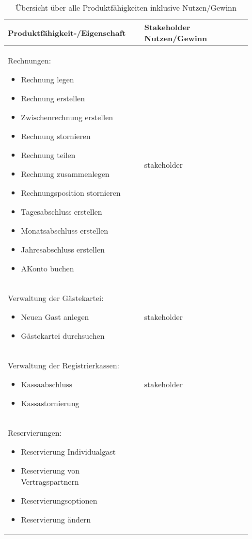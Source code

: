 \documentclass[../../Pflichtenheft.tex]{subfiles}
\begin{document}
    \begin{longtable}{|p{7cm}|p{7cm}|}
        \caption{Übersicht über alle Produktfähigkeiten inklusive Nutzen/Gewinn}
        \hline
        Produktfähigkeit-/Eigenschaft & Stakeholder Nutzen/Gewinn \\ \hline
        Rechnungen:
        \begin{itemize}
            \item Rechnung legen
            \item Rechnung erstellen
            \item Zwischenrechnung erstellen
            \item Rechnung stornieren
            \item Rechnung teilen
            \item Rechnung zusammenlegen
            \item Rechnungsposition stornieren
            \item Tagesabschluss erstellen
            \item Monatsabschluss erstellen
            \item Jahresabschluss erstellen
            \item AKonto buchen
        \end{itemize}
        & stakeholder
        \\ \hline
        Verwaltung der Gästekartei:
        \begin{itemize}
            \item Neuen Gast anlegen
            \item Gästekartei durchsuchen
        \end{itemize}
        & stakeholder
        \\ \hline
        Verwaltung der Registrierkassen:
        \begin{itemize}
            \item Kassaabschluss
            \item Kassastornierung
        \end{itemize}
        & stakeholder
        \\ \hline
        Reservierungen:
        \begin{itemize}
            \item Reservierung Individualgast
            \item Reservierung von Vertragspartnern
            \item Reservierungsoptionen
            \item Reservierung ändern

\end{itemize}
\end{longtable}
\end{document}

